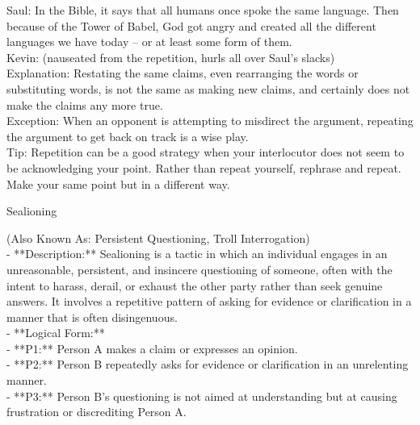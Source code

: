 \documentclass[a4paper,12pt,single,pdftex]{scrartcl}
\begin{document}
{    
      Saul: In the Bible, it says that all humans once spoke the same language.  Then because of the Tower of Babel, God got angry and created all the different languages we have today -- or at least some form of them.
    \\

    
      Kevin: (nauseated from the repetition, hurls all over Saul’s slacks)
    \\

    
      Explanation: Restating the same claims, even rearranging the words or substituting words, is not the same as making new claims, and certainly does not make the claims any more true.
    \\

    
      Exception: When an opponent is attempting to misdirect the argument, repeating the argument to get back on track is a wise play.
    \\

    
      Tip: Repetition can be a good strategy when your interlocutor does not seem to be acknowledging your point. Rather than repeat yourself, rephrase and repeat. Make your same point but in a different way.
    \\

  }


Sealioning
    
      (Also Known As: Persistent Questioning, Troll Interrogation)
    \\

  
    
      - **Description:** Sealioning is a tactic in which an individual engages in an unreasonable, persistent, and insincere questioning of someone, often with the intent to harass, derail, or exhaust the other party rather than seek genuine answers. It involves a repetitive pattern of asking for evidence or clarification in a manner that is often disingenuous.
    \\

    
      - **Logical Form:**
    \\

    
        - **P1:** Person A makes a claim or expresses an opinion.
    \\

    
        - **P2:** Person B repeatedly asks for evidence or clarification in an unrelenting manner.
    \\

    
        - **P3:** Person B's questioning is not aimed at understanding but at causing frustration or discrediting Person A.
    \\
\end{document}
